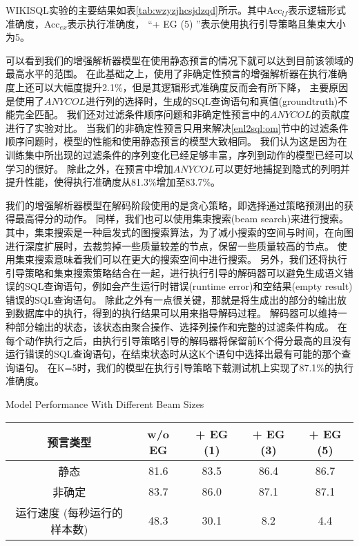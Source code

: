 WIKISQL实验的主要结果如表\ref{tab:wzyzjhcsjdzqd}所示。其中Acc$_{lf}$表示逻辑形式准确度，Acc$_{ex}$表示执行准确度，
“+ EG (5) ”表示使用执行引导策略且集束大小为5。

可以看到我们的增强解析器模型在使用静态预言的情况下就可以达到目前该领域的最高水平\cite{dong2018coarse}的范围。
在此基础之上，使用了非确定性预言的增强解析器在执行准确度上还可以大幅度提升2.1\%，但是其逻辑形式准确度反而会有所下降，
主要原因是使用了$ANYCOL$进行列的选择时，生成的SQL查询语句和真值(groundtruth)不能完全匹配。
我们还对过滤条件顺序问题和非确定性预言中的$ANYCOL$的贡献度进行了实验对比。
当我们的非确定性预言只用来解决\ref{enl2sql:om}节中的过滤条件顺序问题时，模型的性能和使用静态预言的模型大致相同。
我们认为这是因为在训练集中所出现的过滤条件的序列变化已经足够丰富，序列到动作的模型已经可以学习的很好。
除此之外，在预言中增加$ANYCOL$可以更好地捕捉到隐式的列明并提升性能，使得执行准确度从81.3\%增加至83.7\%。

我们的增强解析器模型在解码阶段使用的是贪心策略，即选择通过策略预测出的获得最高得分的动作。
同样，我们也可以使用集束搜索(beam search)来进行搜索。
其中，集束搜索是一种启发式的图搜索算法，为了减小搜索的空间与时间，在向图进行深度扩展时，去裁剪掉一些质量较差的节点，保留一些质量较高的节点。
使用集束搜索意味着我们可以在更大的搜索空间中进行搜索。
另外，我们还将执行引导策略和集束搜索策略结合在一起，进行执行引导的解码器可以避免生成语义错误的SQL查询语句，例如会产生运行时错误(runtime error)和空结果(empty result)错误的SQL查询语句。
除此之外有一点很关键，那就是将生成出的部分的输出放到数据库中的执行，得到的执行结果可以用来指导解码过程。
解码器可以维持一种部分输出的状态，该状态由聚合操作、选择列操作和完整的过滤条件构成。
在每个动作执行之后，由执行引导策略引导的解码器将保留前K个得分最高的且没有运行错误的SQL查询语句，在结束状态时从这K个语句中选择出最有可能的那个查询语句。
在K=5时，我们的模型在执行引导策略下载测试机上实现了87.1\%的执行准确度。

\begin{table}[!hpb]
  \centering
    {Model Performance With Different Beam Sizes}
  \label{enl2sql:sybtjsdxdmxxn}
  \begin{tabular}{ccccc} \toprule
    \textbf{预言类型} & \textbf{w/o EG} & \textbf{+ EG (1)} & \textbf{+ EG (3)} & \textbf{+ EG (5)}\\\midrule
    静态 & 81.6 & 83.5 & 86.4 & 86.7\\
    非确定 & 83.7 & 86.0 & 87.1 & 87.1\\\midrule
    运行速度 (每秒运行的样本数) & 48.3 & 30.1 & 8.2 & 4.4\\
    \bottomrule
  \end{tabular}
\end{table}

